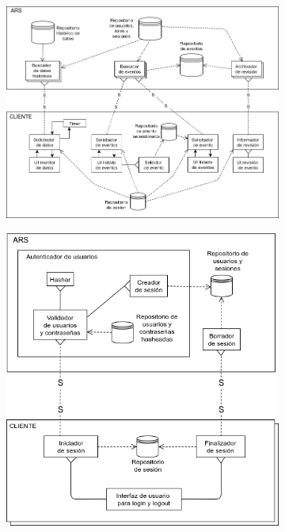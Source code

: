 \begin{figure}[h]
  \begin{subfigure}{\textwidth}
    \includegraphics[width=\textwidth]{imagenes/diagramas/interaccionConClientes.png}
  \end{subfigure}
  \label{}
  \caption{}
\end{figure}

\begin{figure}[h]
  \begin{subfigure}{\textwidth}
    \includegraphics[width=\textwidth]{imagenes/diagramas/loginYLogout.png}
  \end{subfigure}
  \label{}
  \caption{}
\end{figure}

